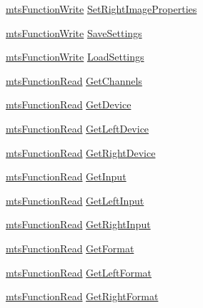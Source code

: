 \begin{DoxyCompactItemize}
\item 
\hyperlink{classmts_function_write}{mts\+Function\+Write} \hyperlink{class_i_req_filter_source_video_capture_a8bc5a60a44fdc2ab5f539ead85190a92}{Set\+Right\+Image\+Properties}
\item 
\hyperlink{classmts_function_write}{mts\+Function\+Write} \hyperlink{class_i_req_filter_source_video_capture_ae85aabe80e1aab1ceed48c8778600726}{Save\+Settings}
\item 
\hyperlink{classmts_function_write}{mts\+Function\+Write} \hyperlink{class_i_req_filter_source_video_capture_ad3519c324883b31f1ea45340b8764adc}{Load\+Settings}
\item 
\hyperlink{classmts_function_read}{mts\+Function\+Read} \hyperlink{class_i_req_filter_source_video_capture_ae3dcbda603dba36a1812e7de73e04c4a}{Get\+Channels}
\item 
\hyperlink{classmts_function_read}{mts\+Function\+Read} \hyperlink{class_i_req_filter_source_video_capture_a1476275d88028dff37eecfd48dc9960e}{Get\+Device}
\item 
\hyperlink{classmts_function_read}{mts\+Function\+Read} \hyperlink{class_i_req_filter_source_video_capture_ac194545c5ce0ebce6caa938325c8f528}{Get\+Left\+Device}
\item 
\hyperlink{classmts_function_read}{mts\+Function\+Read} \hyperlink{class_i_req_filter_source_video_capture_ac2e5f4c6af32e192fef7f7f5c0ac77d6}{Get\+Right\+Device}
\item 
\hyperlink{classmts_function_read}{mts\+Function\+Read} \hyperlink{class_i_req_filter_source_video_capture_aa13ec6756e50314d83f3cc0e1fb34b3b}{Get\+Input}
\item 
\hyperlink{classmts_function_read}{mts\+Function\+Read} \hyperlink{class_i_req_filter_source_video_capture_a853883a36d1b5bb096fe490a8387904e}{Get\+Left\+Input}
\item 
\hyperlink{classmts_function_read}{mts\+Function\+Read} \hyperlink{class_i_req_filter_source_video_capture_ac76226dfeba6131ef09529ee876ebb6b}{Get\+Right\+Input}
\item 
\hyperlink{classmts_function_read}{mts\+Function\+Read} \hyperlink{class_i_req_filter_source_video_capture_a91de3e359f5612e0b37bce18062962dd}{Get\+Format}
\item 
\hyperlink{classmts_function_read}{mts\+Function\+Read} \hyperlink{class_i_req_filter_source_video_capture_ae8b53691a95cdd8d988433bd9fdb8bbe}{Get\+Left\+Format}
\item 
\hyperlink{classmts_function_read}{mts\+Function\+Read} \hyperlink{class_i_req_filter_source_video_capture_a81c7016f009cc1f7092a6e0f3ff6db65}{Get\+Right\+Format}

\end{DoxyCompactItemize}
